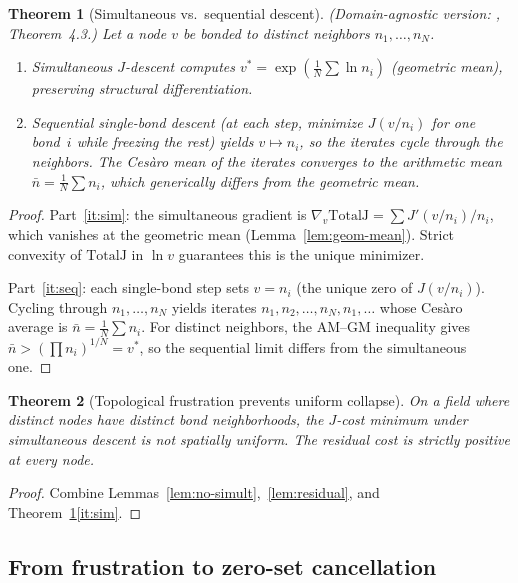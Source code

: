 \documentclass[12pt, reqno]{amsart}
\newtheorem{theorem}{Theorem}[section]
\theoremstyle{definition}
\theoremstyle{remark}
\numberwithin{equation}{section}
\newcommand{\Jc}{J}
\begin{document}
\begin{theorem}[Simultaneous vs.\ sequential descent]\label{thm:sim-seq}
\textup{(}Domain-agnostic version: \cite{F1JCost}, Theorem~4.3.\textup{)}
Let a node $v$ be bonded to distinct neighbors $n_1,\dots,n_N$.
\begin{enumerate}[label=\textup{(\roman*)}]
\item\label{it:sim}
Simultaneous $\Jc$-descent computes
$v^*=\exp(\tfrac1N\sum\ln n_i)$ (geometric mean), preserving
structural differentiation.
\item\label{it:seq}
Sequential single-bond descent (at each step, minimize $\Jc(v/n_i)$
for one bond~$i$ while freezing the rest) yields
$v\mapsto n_i$, so the iterates cycle through the neighbors.  The
Ces\`aro mean of the iterates converges to the arithmetic mean
$\bar n=\tfrac1N\sum n_i$, which generically differs from the
geometric mean.
\end{enumerate}
\end{theorem}
\begin{proof}
Part~\ref{it:sim}: the simultaneous gradient is
$\nabla_v\mathrm{TotalJ}=\sum\Jc'(v/n_i)/n_i$, which vanishes at the
geometric mean (Lemma~\ref{lem:geom-mean}).  Strict convexity of
$\mathrm{TotalJ}$ in $\ln v$ guarantees this is the unique minimizer.

Part~\ref{it:seq}: each single-bond step sets $v=n_i$ (the unique
zero of $\Jc(v/n_i)$).  Cycling through $n_1,\dots,n_N$ yields
iterates $n_1,n_2,\dots,n_N,n_1,\dots$ whose Ces\`aro average is
$\bar n=\tfrac1N\sum n_i$.  For distinct neighbors, the AM--GM
inequality gives $\bar n > (\prod n_i)^{1/N}=v^*$, so the sequential
limit differs from the simultaneous one.
\end{proof}

\begin{theorem}[Topological frustration prevents uniform collapse]%
\label{thm:TF-master}
On a field where distinct nodes have distinct bond neighborhoods,
the $\Jc$-cost minimum under simultaneous descent is not spatially
uniform.  The residual cost is strictly positive at every node.
\end{theorem}
\begin{proof}
Combine Lemmas~\ref{lem:no-simult},~\ref{lem:residual}, and
Theorem~\ref{thm:sim-seq}\ref{it:sim}.
\end{proof}

\subsection{From frustration to zero-set cancellation}
\end{document}
